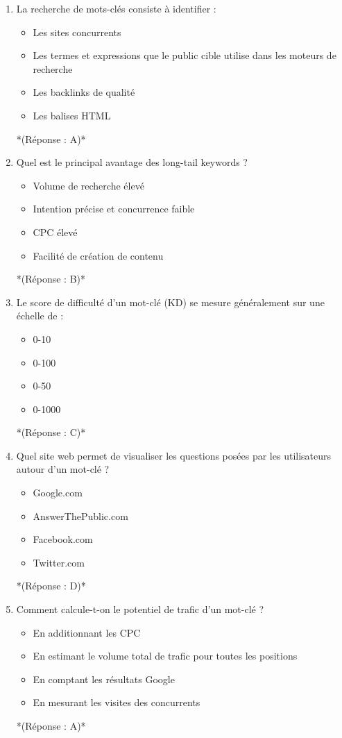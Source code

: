 \documentclass[12pt,a4paper,twoside]{report}
\begin{document}
\begin{enumerate}
\item La recherche de mots-clés consiste à identifier :
\begin{itemize}
\item[A)] Les sites concurrents
\item[B)] Les termes et expressions que le public cible utilise dans les moteurs de recherche
\item[C)] Les backlinks de qualité
\item[D)] Les balises HTML
\end{itemize}
*(Réponse : A)*

\item Quel est le principal avantage des long-tail keywords ?
\begin{itemize}
\item[A)] Volume de recherche élevé
\item[B)] Intention précise et concurrence faible
\item[C)] CPC élevé
\item[D)] Facilité de création de contenu
\end{itemize}
*(Réponse : B)*

\item Le score de difficulté d'un mot-clé (KD) se mesure généralement sur une échelle de :
\begin{itemize}
\item[A)] 0-10
\item[B)] 0-100
\item[C)] 0-50
\item[D)] 0-1000
\end{itemize}
*(Réponse : C)*

\item Quel site web permet de visualiser les questions posées par les utilisateurs autour d'un mot-clé ?
\begin{itemize}
\item[A)] Google.com
\item[B)] AnswerThePublic.com
\item[C)] Facebook.com
\item[D)] Twitter.com
\end{itemize}
*(Réponse : D)*

\item Comment calcule-t-on le potentiel de trafic d'un mot-clé ?
\begin{itemize}
\item[A)] En additionnant les CPC
\item[B)] En estimant le volume total de trafic pour toutes les positions
\item[C)] En comptant les résultats Google
\item[D)] En mesurant les visites des concurrents
\end{itemize}
*(Réponse : A)*


\end{enumerate}
\end{document}
